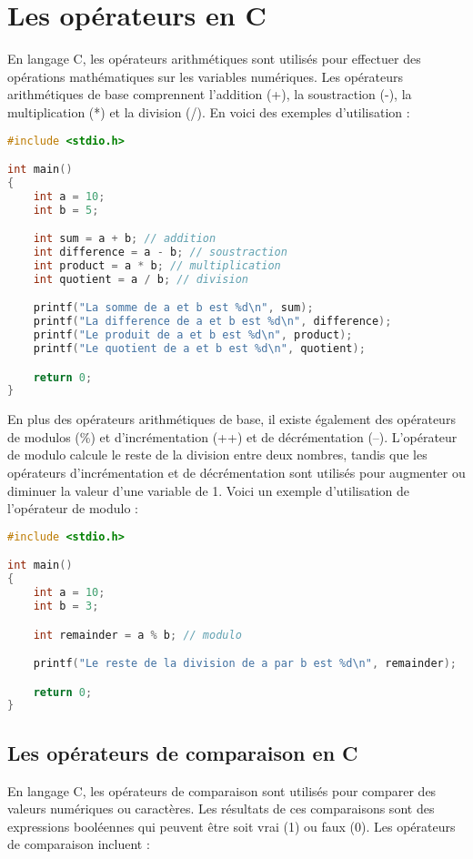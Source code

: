 \documentclass{uofa-eng-assignment}
\begin{document}
\section{Les opérateurs en C}
En langage C, les opérateurs arithmétiques sont utilisés pour effectuer des opérations mathématiques sur les variables numériques. Les opérateurs arithmétiques de base comprennent l'addition (+), la soustraction (-), la multiplication (*) et la division (/).
\newline \newline
En voici des exemples d'utilisation :
\begin{lstlisting}[language=C]
#include <stdio.h>

int main()
{
    int a = 10;
    int b = 5;

    int sum = a + b; // addition
    int difference = a - b; // soustraction
    int product = a * b; // multiplication
    int quotient = a / b; // division

    printf("La somme de a et b est %d\n", sum);
    printf("La difference de a et b est %d\n", difference);
    printf("Le produit de a et b est %d\n", product);
    printf("Le quotient de a et b est %d\n", quotient);

    return 0;
}
\end{lstlisting}

\noindent \newline
En plus des opérateurs arithmétiques de base, il existe également des opérateurs de modulos (\%) et d'incrémentation (++) et de décrémentation (--). L'opérateur de modulo calcule le reste de la division entre deux nombres, tandis que les opérateurs d'incrémentation et de décrémentation sont utilisés pour augmenter ou diminuer la valeur d'une variable de 1.
\newline \newline
Voici un exemple d'utilisation de l'opérateur de modulo :

\begin{lstlisting}[language=C]
#include <stdio.h>

int main()
{
    int a = 10;
    int b = 3;

    int remainder = a % b; // modulo

    printf("Le reste de la division de a par b est %d\n", remainder);

    return 0;
}
\end{lstlisting}

\subsection{Les opérateurs de comparaison en C}
En langage C, les opérateurs de comparaison sont utilisés pour comparer des valeurs numériques ou caractères. Les résultats de ces comparaisons sont des expressions booléennes qui peuvent être soit vrai (1) ou faux (0). Les opérateurs de comparaison incluent :
\end{document}

